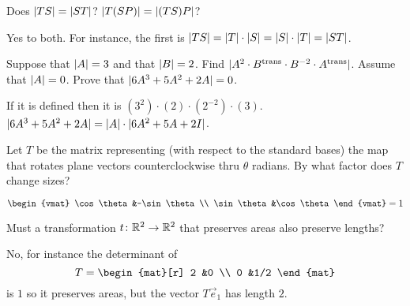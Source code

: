 \begin{exercises}
    Does \( \deter{TS}=\deter{ST} \)?
    \( \deter{T(SP)}=\deter{(TS)P} \)?
    \begin{answer}
      Yes to both.
      For instance, the first is \( \deter{TS}=\deter{T}\cdot\deter{S}=
                     \deter{S}\cdot\deter{T}=\deter{ST} \).  
    \end{answer}
  \item 
   \begin{exparts}
     \partsitem Suppose that \( \deter{A}=3 \) and that \( \deter{B}=2 \).
        Find \( \deter{A^2\cdot \trans{B}\cdot B^{-2}\cdot \trans{A} } \).
     \partsitem Assume that \( \deter{A}=0 \).
        Prove that \( \deter{6A^3+5A^2+2A}=0 \).
    \end{exparts}
    \begin{answer}
      \begin{exparts}
        \partsitem If it is defined then it is 
           \( (3^2)\cdot (2)\cdot (2^{-2})\cdot (3) \).
        \partsitem \( \deter{6A^3+5A^2+2A}=\deter{A}\cdot\deter{6A^2+5A+2I} \).
      \end{exparts}  
    \end{answer}
  \recommended \item
    Let \( T \) be the matrix representing (with respect to the standard
    bases) the map that rotates plane vectors counterclockwise thru
    \( \theta \) radians.
    By what factor does \( T \) change sizes?
    \begin{answer}
       \(\begin{vmat}
                \cos\theta  &-\sin\theta  \\
                \sin\theta  &\cos\theta
              \end{vmat}=1 \)  
    \end{answer}
  \recommended \item
    Must a transformation \( \mbox{$t\colon \mathbb{R}^2\to \mathbb{R}^2$} \) that preserves areas
    also preserve lengths?
    \begin{answer}
      No, for instance the determinant of 
      \begin{equation*}
        T=\begin{mat}[r]
          2  &0  \\
          0  &1/2
        \end{mat}
      \end{equation*}
      is \( 1 \) so it preserves areas, but the vector \( T\vec{e}_1 \)
      has length \( 2 \).  
    \end{answer}
  \recommended \item

\end{exercises}
